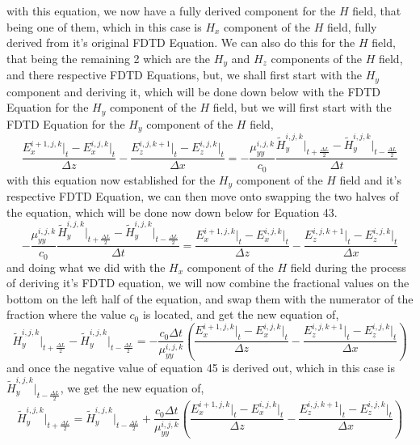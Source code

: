 \documentclass[]{article}
\begin{document}
with this equation, we now have a fully derived component for the $H$ field, that being one of them, which in this case is $H_x$ component of the $H$ field, fully derived from it's original FDTD Equation. We can also do this for the $H$ field, that being the remaining 2 which are the $H_y$ and $H_z$ components of the $H$ field, and there respective FDTD Equations, but, we shall first start with the $H_y$ component and deriving it, which will be done down below with the FDTD Equation for the $H_y$ component of the $H$ field, but we will first start with the FDTD Equation for the $H_y$ component of the $H$ field,
\begin{equation}
\frac{E_{x}^{i+1, j, k} \Big|_t - E_{x}^{i,j,k}\Big|_t}{\Delta{z}} - \frac{E_{z}^{i, j, k+1} \Big|_t - E_{z}^{i,j,k}\Big|_t}{\Delta{x}} = -\frac{\mu_{yy}^{i,j,k}}{c_0} \frac{\tilde{H}_{y}^{i,j,k}\Big|_{t+\frac{\Delta{L}}{2}} - \tilde{H}_{y}^{i,j,k}\Big|_{t - \frac{\Delta{L}}{2}}}{\Delta{t}}
\end{equation}
with this equation now established for the $H_y$ component of the $H$ field and it's respective FDTD Equation, we can then move onto swapping the two halves of the equation, which will be done now down below for Equation 43.
\begin{equation}
-\frac{\mu_{yy}^{i,j,k}}{c_0} \frac{\tilde{H}_{y}^{i,j,k}\Big|_{t+\frac{\Delta{L}}{2}} - \tilde{H}_{y}^{i,j,k}\Big|_{t - \frac{\Delta{L}}{2}}}{\Delta{t}} = \frac{E_{x}^{i+1, j, k} \Big|_t - E_{x}^{i,j,k}\Big|_t}{\Delta{z}} - \frac{E_{z}^{i, j, k+1} \Big|_t - E_{z}^{i,j,k}\Big|_t}{\Delta{x}}
\end{equation}
and doing what we did with the $H_x$ component of the $H$ field during the process of deriving it's FDTD equation, we will now combine the fractional values on the bottom on the left half of the equation, and swap them with the numerator of the fraction where the value $c_0$ is located, and get the new equation of,
\begin{equation}
\tilde{H}_{y}^{i,j,k}\Big|_{t+\frac{\Delta{L}}{2}} - \tilde{H}_{y}^{i,j,k}\Big|_{t-\frac{\Delta{L}}{2}} = -\frac{c_0\Delta{t}}{\mu_{yy}^{i,j,k}} \left(\frac{E_{x}^{i+1,j,k} \Big|_t - E_{x}^{i,j,k}\Big|_t}{\Delta{z}} - \frac{E_{z}^{i,j,k+1} \Big|_t - E_{z}^{i,j,k}\Big|_t}{\Delta{x}}\right)
\end{equation}
and once the negative value of equation 45 is derived out, which in this case is $\tilde{H}_{y}^{i,j,k}\Big|_{t-\frac{\Delta{L}}{2}}$, we get the new equation of,
\begin{equation}
\tilde{H}_y^{i,j,k}\Big|_{t+\frac{\Delta{L}}{2}} = \tilde{H}_{y}^{i,j,k}\Big|_{t-\frac{\Delta{L}}{2}} + \frac{c_0\Delta{t}}{\mu_{yy}^{i,j,k}} \left(\frac{E_{x}^{i+1,j,k} \Big|_t - E_{x}^{i,j,k}\Big|_t}{\Delta{z}} - \frac{E_{z}^{i,j,k+1} \Big|_t - E_{z}^{i,j,k}\Big|_t}{\Delta{x}}\right)
\end{equation}
\end{document}
